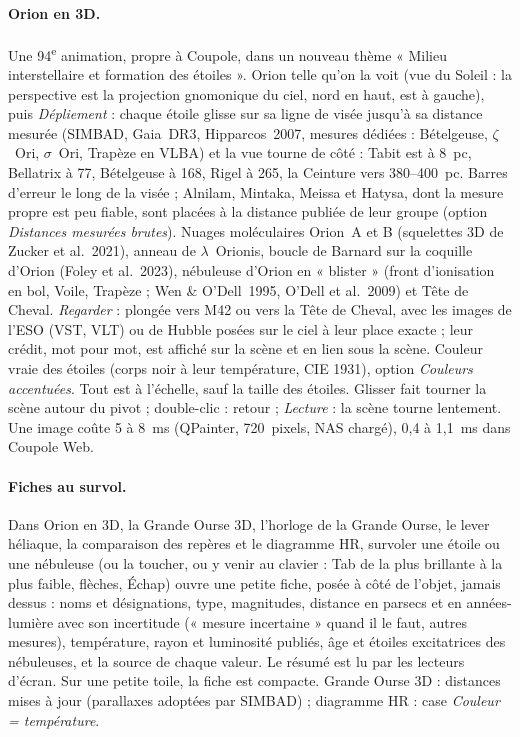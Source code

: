 \paragraph{Orion en 3D.} Une 94\textsuperscript{e} animation, propre à Coupole, dans un nouveau thème « Milieu
interstellaire et formation des étoiles ». Orion telle qu'on la voit (vue du Soleil : la perspective est la projection
gnomonique du ciel, nord en haut, est à gauche), puis \emph{Dépliement} : chaque étoile glisse sur sa ligne de visée
jusqu'à sa distance mesurée (SIMBAD, Gaia~DR3, Hipparcos~2007, mesures dédiées : Bételgeuse, $\zeta$~Ori,
$\sigma$~Ori, Trapèze en VLBA) et la vue tourne de côté : Tabit est à 8~pc, Bellatrix à 77, Bételgeuse à 168, Rigel
à 265, la Ceinture vers 380–400~pc. Barres d'erreur le long de la visée ; Alnilam, Mintaka, Meissa et Hatysa, dont
la mesure propre est peu fiable, sont placées à la distance publiée de leur groupe (option \emph{Distances mesurées
brutes}). Nuages moléculaires Orion~A et B (squelettes 3D de Zucker et al.~2021), anneau de $\lambda$~Orionis, boucle
de Barnard sur la coquille d'Orion (Foley et al.~2023), nébuleuse d'Orion en « blister » (front d'ionisation en bol,
Voile, Trapèze ; Wen \& O'Dell~1995, O'Dell et al.~2009) et Tête de Cheval. \emph{Regarder} : plongée vers M42 ou
vers la Tête de Cheval, avec les images de l'ESO (VST, VLT) ou de Hubble posées sur le ciel à leur place exacte ;
leur crédit, mot pour mot, est affiché sur la scène et en lien sous la scène. Couleur vraie des étoiles (corps noir à
leur température, CIE 1931), option \emph{Couleurs accentuées}. Tout est à l'échelle, sauf la taille des étoiles.
Glisser fait tourner la scène autour du pivot ; double-clic : retour ; \emph{Lecture} : la scène tourne lentement.
Une image coûte 5 à 8~ms (QPainter, 720~pixels, NAS chargé), 0,4 à 1,1~ms dans Coupole Web.

\paragraph{Fiches au survol.} Dans Orion en 3D, la Grande Ourse 3D, l'horloge de la Grande Ourse, le lever
héliaque, la comparaison des repères et le diagramme HR, survoler une étoile ou une nébuleuse (ou la toucher, ou y
venir au clavier : Tab de la plus brillante à la plus faible, flèches, Échap) ouvre une petite fiche, posée à côté de
l'objet, jamais dessus : noms et désignations, type, magnitudes, distance en parsecs et en années-lumière avec son
incertitude (« mesure incertaine » quand il le faut, autres mesures), température, rayon et luminosité publiés, âge et
étoiles excitatrices des nébuleuses, et la source de chaque valeur. Le résumé est lu par les lecteurs d'écran. Sur une
petite toile, la fiche est compacte. Grande Ourse 3D : distances mises à jour (parallaxes adoptées par SIMBAD) ;
diagramme HR : case \emph{Couleur = température}.

